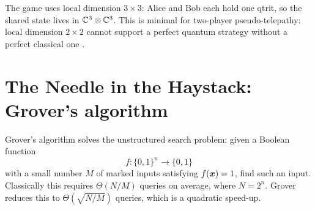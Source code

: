 The game uses local dimension \(3\times3\): Alice and Bob each hold one qtrit, so the shared state lives in \(\mathbb{C}^3\otimes\mathbb{C}^3\).
This is minimal for two-player pseudo-telepathy: local dimension \(2\times2\) cannot support a perfect quantum strategy without a perfect classical one \cite{rennerWolfPseudoTelepathy}.




\clearpage




\section{The Needle in the Haystack: Grover's algorithm}\label{sec:grover}

Grover's algorithm solves the unstructured search problem: given a Boolean function
\[
f:\{0,1\}^n\to\{0,1\}
\]
with a small number $M$ of marked inputs satisfying
\(
f({\boldsymbol{x}})=1
\),
find such an input.
Classically this requires
\(
\Theta(N/M)
\)
queries on average, where
\(
N=2^n
\).
Grover reduces this to
\(
\Theta(\sqrt{N/M})
\)
queries,
which is a quadratic  
speed-up.


